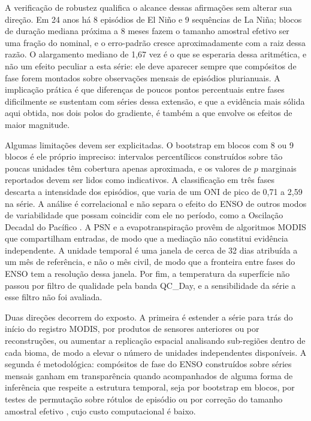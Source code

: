 \documentclass[a4paper,fleqn]{cas-sc}
\begin{document}
A verificação de robustez qualifica o alcance dessas afirmações sem alterar sua direção. Em 24 anos há 8 episódios de El Niño e 9 sequências de La Niña; blocos de duração mediana próxima a 8 meses fazem o tamanho amostral efetivo ser uma fração do nominal, e o erro-padrão cresce aproximadamente com a raiz dessa razão. O alargamento mediano de 1,67 vez é o que se esperaria dessa aritmética, e não um efeito peculiar a esta série: ele deve aparecer sempre que compósitos de fase forem montados sobre observações mensais de episódios plurianuais. A implicação prática é que diferenças de poucos pontos percentuais entre fases dificilmente se sustentam com séries dessa extensão, e que a evidência mais sólida aqui obtida, nos dois polos do gradiente, é também a que envolve os efeitos de maior magnitude.

Algumas limitações devem ser explicitadas. O bootstrap em blocos com 8 ou 9 blocos é ele próprio impreciso: intervalos percentílicos construídos sobre tão poucas unidades têm cobertura apenas aproximada, e os valores de $p$ marginais reportados devem ser lidos como indicativos. A classificação em três fases descarta a intensidade dos episódios, que varia de um ONI de pico de 0,71 a 2,59 na série. A análise é correlacional e não separa o efeito do ENSO de outros modos de variabilidade que possam coincidir com ele no período, como a Oscilação Decadal do Pacífico \citep{kayano2007}. A PSN e a evapotranspiração provêm de algoritmos MODIS que compartilham entradas, de modo que a mediação não constitui evidência independente. A unidade temporal é uma janela de cerca de 32 dias atribuída a um mês de referência, e não o mês civil, de modo que a fronteira entre fases do ENSO tem a resolução dessa janela. Por fim, a temperatura da superfície não passou por filtro de qualidade pela banda QC\_Day, e a sensibilidade da série a esse filtro não foi avaliada.

Duas direções decorrem do exposto. A primeira é estender a série para trás do início do registro MODIS, por produtos de sensores anteriores ou por reconstruções, ou aumentar a replicação espacial analisando sub-regiões dentro de cada bioma, de modo a elevar o número de unidades independentes disponíveis. A segunda é metodológica: compósitos de fase do ENSO construídos sobre séries mensais ganham em transparência quando acompanhados de alguma forma de inferência que respeite a estrutura temporal, seja por bootstrap em blocos, por testes de permutação sobre rótulos de episódio ou por correção do tamanho amostral efetivo \citep{kunsch1989, politis1994}, cujo custo computacional é baixo.
\end{document}
